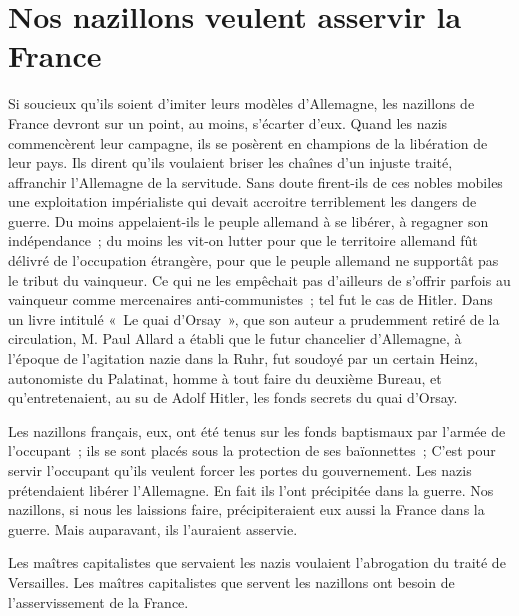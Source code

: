 \documentclass[french,twoside]{book} %
\begin{document}
\section[{Nos nazillons veulent asservir la France}]{Nos nazillons veulent asservir la France}
\noindent Si soucieux qu’ils soient d’imiter leurs modèles d’Allemagne, les nazillons de France devront sur un point, au moins, s’écarter d’eux. Quand les nazis commencèrent leur campagne, ils se posèrent en champions de la libération de leur pays. Ils dirent qu’ils voulaient briser les chaînes d’un injuste traité, affranchir l’Allemagne de la servitude. Sans doute firent-ils de ces nobles mobiles une exploitation impérialiste qui devait accroitre terriblement les dangers de guerre. Du moins appelaient-ils le peuple allemand à se libérer, à regagner son indépendance ; du moins les vit-on lutter pour que le territoire allemand fût délivré de l’occupation étrangère, pour que le peuple allemand ne supportât pas le tribut du vainqueur. Ce qui ne les empêchait pas d’ailleurs de s’offrir parfois au vainqueur comme mercenaires anti-communistes ; tel fut le cas de Hitler. Dans un livre intitulé « Le quai d’Orsay », que son auteur a prudemment retiré de la circulation, M. Paul Allard a établi que le futur chancelier d’Allemagne, à l’époque de l’agitation nazie dans la Ruhr, fut soudoyé par un certain Heinz, autonomiste du Palatinat, homme à tout faire du deuxième Bureau, et qu’entretenaient, au su de Adolf Hitler, les fonds secrets du quai d’Orsay.\par
Les nazillons français, eux, ont été tenus sur les fonds baptismaux par l’armée de l’occupant ; ils se sont placés sous la protection de ses baïonnettes ; C’est pour servir l’occupant qu’ils veulent forcer les portes du gouvernement. Les nazis prétendaient libérer l’Allemagne. En fait ils l’ont précipitée dans la guerre. Nos nazillons, si nous les laissions faire, précipiteraient eux aussi la France dans la guerre. Mais auparavant, ils l’auraient asservie.\par
Les maîtres capitalistes que servaient les nazis voulaient l’abrogation du traité de Versailles. Les maîtres capitalistes que servent les nazillons ont besoin de l’asservissement de la France.
\end{document}
